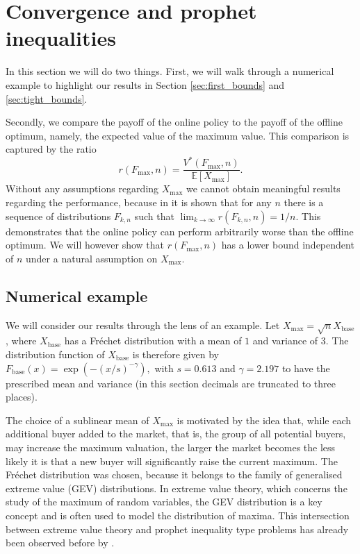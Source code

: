\documentclass[11pt,a4paper]{article}
\numberwithin{equation}{section}
\begin{document}
\section{Convergence and prophet inequalities}
\label{sec:prophets}

In this section we will do two things. First, we will walk through a numerical example to highlight our results in Section \ref{sec:first_bounds} and \ref{sec:tight_bounds}.

Secondly, we compare the payoff of the online policy to the payoff of the offline optimum, namely, the expected value of the maximum value. 
This comparison is captured by the ratio
$$
r(F_{\max},n)=\frac{V^*(F_{\max},n)}{\mathbb{E}[X_{\max}]}.
$$
Without any assumptions regarding $X_{\max}$ we cannot obtain meaningful results regarding the performance, because in \cite{hill1983stop} it is shown that for any $n$ there is a sequence of distributions $F_{k,n}$ such that $\lim_{k\to\infty}r(F_{k,n},n)= 1/n$. This demonstrates that the online policy can perform arbitrarily worse than the offline optimum.
We will however show that $r(F_{\max},n)$ has a lower bound independent of $n$ under a natural assumption on $X_{\max}$.



\subsection{Numerical example}
We will consider our results through the lens of an example. 
Let $X_{\max}=\sqrt{n}X_{\mathrm{base}}$, where $X_{\mathrm{base}}$ has a Fréchet distribution with a mean of $1$ and variance of $3$. The distribution function of $X_{\mathrm{base}}$ is therefore given by 
$
F_{\text{base}}(x)=\exp\left(-\left(x/s\right)^{-\gamma}\right),
$
with $s=0.613$ and $\gamma=2.197$ to have the prescribed mean and variance (in this section decimals are truncated to three places).

The choice of a sublinear mean of $X_{\max}$
is motivated by the idea that,
while each additional buyer added to the market, that is, the group of all potential buyers, may increase the maximum valuation, the larger the market becomes the less likely it is that a new buyer will significantly raise the current maximum. The Fréchet distribution was chosen, because it belongs to the family of generalised extreme value (GEV) distributions.
In extreme value theory, which concerns the study of the maximum of random variables, the GEV distribution is a key concept and is often used to model the distribution of maxima.
This intersection between extreme value theory and prophet inequality type problems has already been observed before by \cite{kennedy1991asymptotic,correa2021optimal,livanos2024minimization}.\medskip
\end{document}
